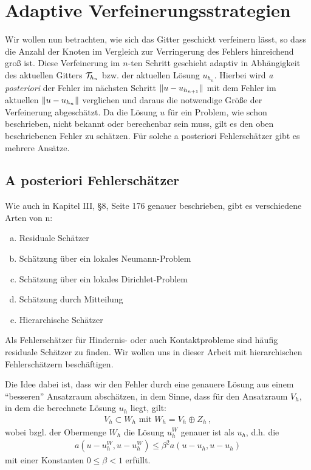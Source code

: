 \section{Adaptive Verfeinerungsstrategien}
\label{kap:2.4}

Wir wollen nun betrachten, wie sich das Gitter geschickt verfeinern lässt, so dass die Anzahl der Knoten im Vergleich zur Verringerung des Fehlers hinreichend groß ist. Diese Verfeinerung im $n$-ten Schritt geschieht adaptiv in Abhängigkeit des aktuellen Gitters $\mathcal T_{h_n}$ bzw. der aktuellen Lösung $u_{h_n}$. Hierbei wird \textit{a posteriori} der Fehler im nächsten Schritt $\lVert u-u_{h_{n+1}}\rVert$ mit dem Fehler im aktuellen $\lVert u-u_{h_n}\rVert$ verglichen und daraus die notwendige Größe der Verfeinerung abgeschätzt. Da die Lösung $u$ für ein Problem, wie  schon beschrieben, nicht bekannt oder berechenbar sein muss, gilt es den oben beschriebenen Fehler zu schätzen. Für solche a posteriori Fehlerschätzer gibt es mehrere Ansätze.


\subsection{A posteriori Fehlerschätzer}
\label{kap:2.4.1}

Wie auch in \cite{BraeFEM} Kapitel III, \S 8, Seite 176 genauer beschrieben, gibt es verschiedene Arten von n:

\begin{enumerate}[(a)]
\item Residuale Schätzer
\item Schätzung über ein lokales Neumann-Problem
\item Schätzung über ein lokales Dirichlet-Problem
\item Schätzung durch Mitteilung
\item Hierarchische Schätzer
\end{enumerate}

Als Fehlerschätzer für Hindernis- oder auch Kontaktprobleme sind häufig residuale Schätzer zu finden. Wir wollen uns in dieser Arbeit mit hierarchischen Fehlerschätzern beschäftigen.

Die Idee dabei ist, dass wir den Fehler durch eine genauere Lösung aus einem "`besseren"' Ansatzraum abschätzen, in dem Sinne, dass für den Ansatzraum $V_h$, in dem die berechnete Lösung $u_h$ liegt, gilt:
\begin{align}
	V_h \subset W_h \text{ mit } W_h = V_h \oplus Z_h \, ,
\end{align}
wobei bzgl. der Obermenge $W_h$ die Lösung $u_h^W$ genauer ist als $u_h$, d.h. die \textit{}
\begin{align}\label{eq:2.18}
	a(u-u_h^W,u-u_h^W) \le \beta^2 a(u-u_h,u-u_h)
\end{align}
mit einer Konstanten $0\le \beta < 1$ erfüllt.

